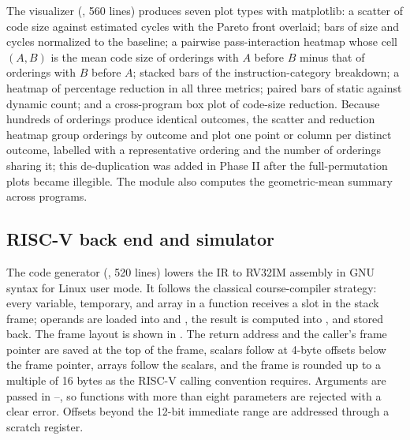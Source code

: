 The visualizer (, 560 lines) produces seven plot types with matplotlib: a scatter of code size against estimated cycles with the Pareto front overlaid; bars of size and cycles normalized to the baseline; a pairwise pass-interaction heatmap whose cell $(A, B)$ is the mean code size of orderings with $A$ before $B$ minus that of orderings with $B$ before $A$; stacked bars of the instruction-category breakdown; a heatmap of percentage reduction in all three metrics; paired bars of static against dynamic count; and a cross-program box plot of code-size reduction. Because hundreds of orderings produce identical outcomes, the scatter and reduction heatmap group orderings by outcome and plot one point or column per distinct outcome, labelled with a representative ordering and the number of orderings sharing it; this de-duplication was added in Phase II after the full-permutation plots became illegible. The module also computes the geometric-mean summary across programs.

\subsection{RISC-V back end and simulator}

The code generator (, 520 lines) lowers the IR to RV32IM assembly in GNU syntax for Linux user mode. It follows the classical course-compiler strategy: every variable, temporary, and array in a function receives a slot in the stack frame; operands are loaded into  and , the result is computed into , and stored back. The frame layout is shown in . The return address and the caller's frame pointer are saved at the top of the frame, scalars follow at 4-byte offsets below the frame pointer, arrays follow the scalars, and the frame is rounded up to a multiple of 16 bytes as the RISC-V calling convention requires. Arguments are passed in --, so functions with more than eight parameters are rejected with a clear error. Offsets beyond the 12-bit immediate range are addressed through a scratch register.

